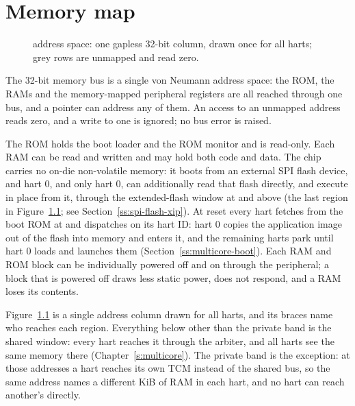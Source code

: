\documentclass[11pt,pdftex,openany,letterpaper]{report}
\begin{document}
\clearpage



\chapter{Memory map} \label{s:addressSpace}

\begin{figure}[!ht]
	\centering
	
	\caption[{\AsicNameForUserGuide{} address space: one column for all \NumHartsWord{} harts}]{\AsicNameForUserGuide{} address space: one gapless 32-bit column, drawn once for all \NumHartsWord{} harts; grey rows are unmapped and read zero.}
	\label{fig:address-space}
\end{figure}

The 32-bit memory bus is a single von Neumann address space: the ROM, the RAMs and the memory-mapped peripheral registers are all reached through one bus, and a pointer can address any of them. An access to an unmapped address reads zero, and a write to one is ignored; no bus error is raised.

The ROM holds the boot loader and the ROM monitor and is read-only. Each RAM can be read and written and may hold both code and data. The chip carries no on-die non-volatile memory: it boots from an external SPI flash device, and hart 0, and only hart 0, can additionally read that flash directly, and execute in place from it, through the extended-flash window at \texttt{\FlashBaseAddress} and above (the last region in Figure~\ref{fig:address-space}; see Section~\ref{ss:spi-flash-xip}). At reset every hart fetches from the boot ROM at \texttt{\RomStartAddress} and dispatches on its hart ID: hart 0 copies the application image out of the flash into memory and enters it, and the remaining harts park until hart 0 loads and launches them (Section~\ref{ss:multicore-boot}). Each RAM and ROM block can be individually powered off and on through the  peripheral; a block that is powered off draws less static power, does not respond, and a RAM loses its contents.

Figure~\ref{fig:address-space} is a single address column drawn for all \NumHartsWord{} harts, and its braces name who reaches each region. Everything below \texttt{\FlashBaseAddress} other than the private band is the shared window: every hart reaches it through the arbiter, and all \NumHartsWord{} harts see the same memory there (Chapter~\ref{s:multicore}). The private band is the exception: at those addresses a hart reaches its own TCM instead of the shared bus, so the same address names a different \TcmSizeKiB{} KiB of RAM in each hart, and no hart can reach another's directly.
\end{document}
